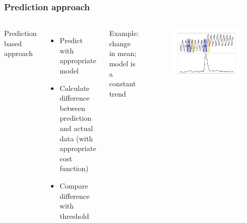 \documentclass[intlimits, 9pt, unicode]{beamer}
\begin{document}
\begin{frame}
    \frametitle{Prediction approach}
  \begin{columns}[T,onlytextwidth]
	Prediction based approach
	    \begin{itemize}
	    	\item Predict with appropriate model
		\item Calculate difference between prediction and actual data (with appropriate cost function)
		\item Compare difference with threshold
	    \end{itemize}
      Example: change in mean; model is a constant trend
      \begin{figure}
	\includegraphics[scale=0.2]{images/approaches_first_5}
	\end{figure}
     \end{columns}
\end{frame}
\end{document}

